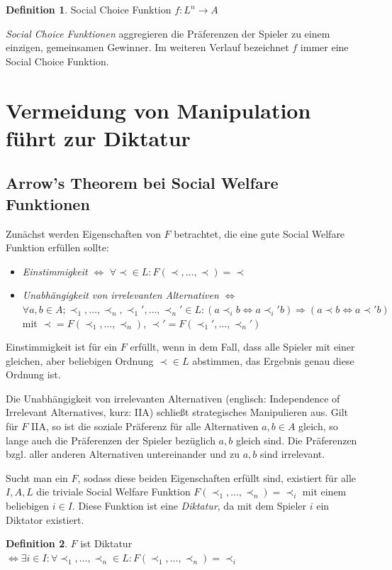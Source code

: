 \documentclass[a4paper,11pt]{article}
\theoremstyle{definition}
\newtheorem{definition}{Definition}
\theoremstyle{plain}
\theoremstyle{definition}
\begin{document}
\begin{definition}
	\label{def:socialchoicefunc}
	Social Choice Funktion $f : L^n \rightarrow A$
\end{definition}
\emph{Social Choice Funktionen} aggregieren die Präferenzen der Spieler zu einem einzigen, gemeinsamen Gewinner. Im weiteren Verlauf bezeichnet $f$ immer eine Social Choice Funktion.

\section{Vermeidung von Manipulation führt zur Diktatur}
\subsection{Arrow's Theorem bei Social Welfare Funktionen}
Zunächst werden Eigenschaften von $F$ betrachtet, die eine gute Social Welfare Funktion erfüllen sollte:
\begin{itemize}
	\item \emph{Einstimmigkeit} $\iff$ $\forall \prec \in L: F(\prec, \ldots,\prec) = \prec$
	\item \emph{Unabhängigkeit von irrelevanten Alternativen}
	$\iff$ $\forall a, b \in A; \prec_1,\ldots,\prec_n, \prec_1', \ldots, \prec_n' \in L:	(a\prec_i b \iff a\prec_i' b) \Rightarrow (a\prec b \iff a\prec' b)$	mit $\prec = F(\prec_1, \ldots, \prec_n)$, $\prec' = F(\prec_1', \ldots, \prec_n')$
\end{itemize}

Einstimmigkeit ist für ein $F$ erfüllt, wenn in dem Fall, dass alle Spieler mit einer gleichen, aber beliebigen Ordnung $\prec \in L$ abstimmen, das Ergebnis genau diese Ordnung ist. 

Die Unabhängigkeit von irrelevanten Alternativen (englisch: Independence of Irrelevant Alternatives, kurz: IIA) schließt strategisches Manipulieren aus. Gilt für $F$ IIA, so ist die soziale Präferenz für alle Alternativen $a, b \in A$ gleich, so lange auch die Präferenzen der Spieler bezüglich $a, b$ gleich sind. Die Präferenzen bzgl. aller anderen Alternativen untereinander und zu $a, b$ sind irrelevant.

Sucht man ein $F$, sodass diese beiden Eigenschaften erfüllt sind, existiert für alle $I, A, L$ die triviale Social Welfare Funktion $F(\prec_1, \ldots, \prec_n) = \prec_i$ mit einem beliebigen $i \in I$. Diese Funktion ist eine \emph{Diktatur}, da mit dem Spieler $i$ ein Diktator existiert. 

\begin{definition}
	\label{def:diktatur}
	$F$ ist Diktatur$\iff\exists i \in I: \forall \prec_1, \ldots, \prec_n \in L: F(\prec_1, \ldots, \prec_n) = \prec_i$
\end{definition}
\end{document}
